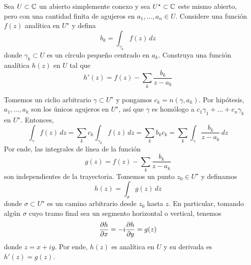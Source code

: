 \begin{exercise}
Sea $U \subset \mathbb C$ un abierto simplemente conexo y sea $U^\star \subset \mathbb C$ este mismo abierto, pero con una cantidad finita de agujeros en $a_1, \dots, a_n \in U$. Considere una función $f(z)$ analítica en $U^\star$ y defina
$$b_k = \int_{\gamma_k} f(z) \, dz$$
donde $\gamma_k \subset U$ es un círculo pequeño centrado en $a_k$. Construya una función analítica $h(z)$ en $U$ tal que
$$h'(z) = f(z) - \sum_k \frac {b_k} {z - a_k}$$
\end{exercise}

\begin{solution}
Tomemos un ciclio arbitrario $\gamma \subset U^\star$ y pongamos $c_k = n(\gamma, a_k)$. Por hipótesis, $a_1, \dots, a_k$ son los únicos agujeros en $U^\star$, así que $\gamma$ es homólogo a $c_1 \gamma_1 + \dots + c_n \gamma_k$ en $U^\star$. Entonces,
$$
\int_\gamma f(z) \, dz
    = \sum_k c_k \int_{\gamma_k} f(z) \, dz
    = \sum_k b_k c_k
    = \sum_k \int_\gamma \frac {b_k} {z - a_k} \, dz
$$
Por ende, las integrales de línea de la función
$$g(z) = f(z) - \sum_k \frac {b_k} {z - a_k}$$
son independientes de la trayectoria. Tomemos un punto $z_0 \in U^\star$ y definamos
$$h(z) = \int_\sigma g(z) \, dz$$
donde $\sigma \subset U^\star$ es un camino arbitrario desde $z_0$ hasta $z$. En particular, tomando algún $\sigma$ cuyo tramo final sea un segmento horizontal o vertical, tenemos
$$\dfrac {\partial h} {\partial x} = -i \dfrac {\partial h} {\partial y} = g(z)$$
donde $z = x + iy$. Por ende, $h(z)$ es analítica en $U$ y su derivada es $h'(z) = g(z)$.
\end{solution}
